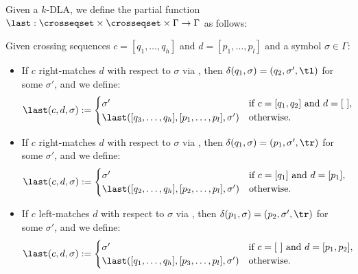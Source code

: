 \begin{defn}
	Given a $k$-DLA, we define the partial function $\last:\crosseqset\times\crosseqset\times\Gamma\to\Gamma$ as follows:

	Given crossing sequences $c=[q_1,\dots,q_h]$ and $d=[p_1,\dots,p_l]$ and a symbol $\sigma\in\Gamma$:
	\begin{itemize}
		\item If $c$ right-matches $d$ with respect to $\sigma$ via , then $\delta(q_1,\sigma)=(q_2,\sigma',\tl)$ for some $\sigma'$, and we define:
		      \begin{equation*}
			      \last(c,d,\sigma):=\begin{cases}
				      \sigma'                                        & \text{if } c=[q_1,q_2] \text{ and } d=[~], \\
				      \last([q_3,\dots,q_h],[p_1,\dots,p_l],\sigma') & \text{otherwise}.
			      \end{cases}
		      \end{equation*}
		\item If $c$ right-matches $d$ with respect to $\sigma$ via , then $\delta(q_1,\sigma)=(p_1,\sigma',\tr)$ for some $\sigma'$, and we define:
		      \begin{equation*}
			      \last(c,d,\sigma):=\begin{cases}
				      \sigma'                                        & \text{if } c=[q_1] \text{ and } d=[p_1],~~ \\
				      \last([q_2,\dots,q_h],[p_2,\dots,p_l],\sigma') & \text{otherwise}.
			      \end{cases}
		      \end{equation*}
		\item If $c$ left-matches $d$ with respect to $\sigma$ via , then $\delta(p_1,\sigma)=(p_2,\sigma',\tr)$ for some $\sigma'$, and we define:
		      \begin{equation*}
			      \last(c,d,\sigma):=\begin{cases}
				      \sigma'                                        & \text{if } c=[~] \text{ and } d=[p_1,p_2], \\
				      \last([q_1,\dots,q_h],[p_3,\dots,p_l],\sigma') & \text{otherwise}.
			      \end{cases}

\end{equation*}
\end{itemize}
\end{defn}
